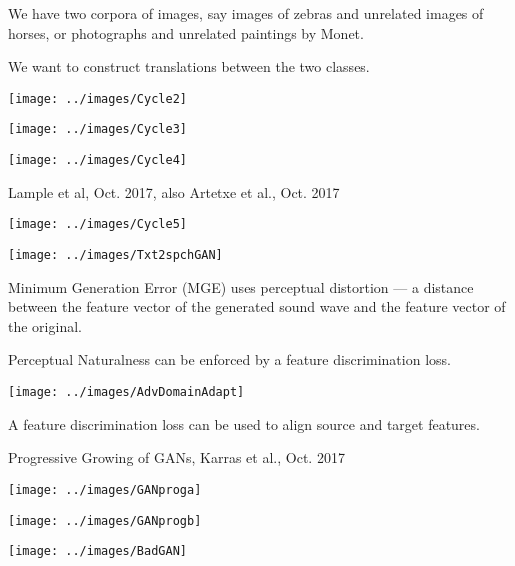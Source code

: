 {

We have two corpora of images, say images of zebras and unrelated images of horses, or photographs and unrelated paintings by Monet.

\vfill
We want to construct translations between the two classes.

\centerline{\texttt{[image: ../images/Cycle2]}}


\centerline{\texttt{[image: ../images/Cycle3]}}


\centerline{\texttt{[image: ../images/Cycle4]}}

         {Lample et al, Oct. 2017, also Artetxe et al., Oct. 2017}

\centerline{\texttt{[image: ../images/Cycle5]}}


\centerline{\texttt{[image: ../images/Txt2spchGAN]}}

\vfill
Minimum Generation Error (MGE) uses {\color{red} perceptual distortion} ---
a distance between the feature vector of the generated sound wave and the
feature vector of the original.

\vfill
{\color{red}Perceptual Naturalness} can be enforced by a feature discrimination loss.


\centerline{\texttt{[image: ../images/AdvDomainAdapt]}}

A feature discrimination loss can be used to align source and target features.


\centerline{Progressive Growing of GANs, Karras et al., Oct. 2017}

\centerline{\texttt{[image: ../images/GANproga]}}


\centerline{\texttt{[image: ../images/GANprogb]}}


\centerline{\texttt{[image: ../images/BadGAN]}}

}
